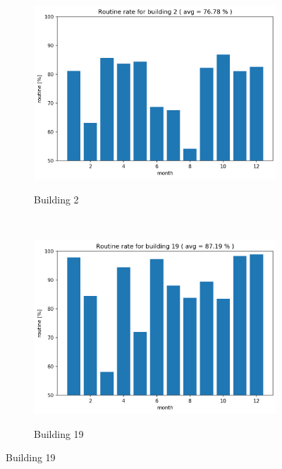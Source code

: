 \begin{figure}[H]
	\begin{subfigure}{.5\textwidth}
		\caption{Building 2}
		\includegraphics[width=1\linewidth]{../Figures/EC/b2year.png}
		\label{fig:ec_b2year}
	\end{subfigure}%
	~ 
	\begin{subfigure}{.5\textwidth}
		\caption{Building 19}
		\includegraphics[width=1\linewidth]{../Figures/EC/b19year.png}
		\label{fig:ec_b5year}
	\end{subfigure}%
    \bigskip


\end{figure}
